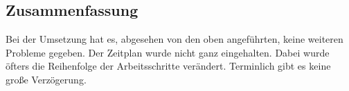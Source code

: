 \subsection{Zusammenfassung}
Bei der Umsetzung hat es, abgesehen von den oben angeführten, keine weiteren Probleme gegeben. Der Zeitplan wurde nicht ganz eingehalten. Dabei wurde öfters die Reihenfolge der Arbeitsschritte verändert. Terminlich gibt es keine große Verzögerung.